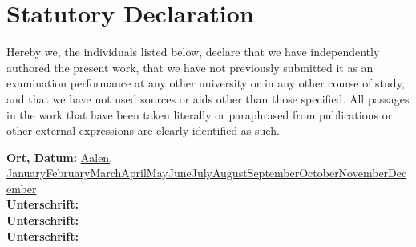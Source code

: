 
\section*{Statutory Declaration}
Hereby we, the individuals listed below, declare that we have independently authored the present work, that we have not previously submitted it as an examination performance at any other university or in any other course of study, and that we have not used sources or aids other than those specified. All passages in the work that have been taken literally or paraphrased from publications or other external expressions are clearly identified as such.
\begin{flushleft}
	  \textbf{Ort, Datum:} \underline{Aalen, \number\day\space\ifcase\month\or January\or February\or March\or April\or May\or June\or July\or August\or September\or October\or November\or December\fi\space\number\year \hspace{5cm}} \\
    \vspace{1cm}
    \textbf{Unterschrift:} \underline{\hspace{5cm}}\\
   	\vspace{1cm}
    \textbf{Unterschrift:} \underline{\hspace{5cm}}\\
    \vspace{1cm}
    \textbf{Unterschrift:} \underline{\hspace{5cm}}
\end{flushleft}

